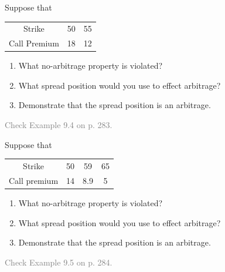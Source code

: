 \begin{frame}[fragile,t]
\begin{myexample}
	Suppose that
	\begin{center}
		\renewcommand{\arraystretch}{1.2}
		\begin{tabular}{ccc}
			Strike       & 50 & 55 \\
			Call Premium & 18 & 12 \\
		\end{tabular}
		\begin{enumerate}
			\item What no-arbitrage property is violated?
			\item What spread position would you use to effect arbitrage?
			\item Demonstrate that the spread position is an arbitrage.
		\end{enumerate}
	\end{center}
\end{myexample}
\pause
\bigskip
\begin{mysol}
	\textcolor{gray}{Check Example 9.4 on p. 283.} \myEnd
\end{mysol}
\end{frame}
\begin{frame}[fragile,t]
\begin{myexample}
	Suppose that
	\begin{center}
		\renewcommand{\arraystretch}{1.2}
		\begin{tabular}{cccc}
			Strike       & 50 & 59  & 65 \\
			Call premium & 14 & 8.9 & 5  \\
		\end{tabular}
		\begin{enumerate}
			\item What no-arbitrage property is violated?
			\item What spread position would you use to effect arbitrage?
			\item Demonstrate that the spread position is an arbitrage.
		\end{enumerate}
	\end{center}
\end{myexample}
\pause
\bigskip
\begin{mysol}
	\textcolor{gray}{Check Example 9.5 on p. 284.} \myEnd
\end{mysol}
\end{frame}
